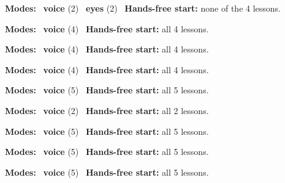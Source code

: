 \expandafter\def\csname hlchaptermodality384\endcsname{%
  {\small\noindent
    \textbf{Modes:} \hlvoicesign{}~\textbf{voice} (2) \quad \hlsightsign{}~\textbf{eyes} (2)\quad
    \hlvoicesign{}~\textbf{Hands-free start:} none of the 4 lessons.%
    \par}\medskip
}

\expandafter\def\csname hlchaptermodality385\endcsname{%
  {\small\noindent
    \textbf{Modes:} \hlvoicesign{}~\textbf{voice} (4)\quad
    \hlvoicesign{}~\textbf{Hands-free start:} all 4 lessons.%
    \par}\medskip
}

\expandafter\def\csname hlchaptermodality386\endcsname{%
  {\small\noindent
    \textbf{Modes:} \hlvoicesign{}~\textbf{voice} (4)\quad
    \hlvoicesign{}~\textbf{Hands-free start:} all 4 lessons.%
    \par}\medskip
}

\expandafter\def\csname hlchaptermodality387\endcsname{%
  {\small\noindent
    \textbf{Modes:} \hlvoicesign{}~\textbf{voice} (4)\quad
    \hlvoicesign{}~\textbf{Hands-free start:} all 4 lessons.%
    \par}\medskip
}

\expandafter\def\csname hlchaptermodality388\endcsname{%
  {\small\noindent
    \textbf{Modes:} \hlvoicesign{}~\textbf{voice} (5)\quad
    \hlvoicesign{}~\textbf{Hands-free start:} all 5 lessons.%
    \par}\medskip
}

\expandafter\def\csname hlchaptermodality389\endcsname{%
  {\small\noindent
    \textbf{Modes:} \hlvoicesign{}~\textbf{voice} (2)\quad
    \hlvoicesign{}~\textbf{Hands-free start:} all 2 lessons.%
    \par}\medskip
}

\expandafter\def\csname hlchaptermodality390\endcsname{%
  {\small\noindent
    \textbf{Modes:} \hlvoicesign{}~\textbf{voice} (5)\quad
    \hlvoicesign{}~\textbf{Hands-free start:} all 5 lessons.%
    \par}\medskip
}

\expandafter\def\csname hlchaptermodality391\endcsname{%
  {\small\noindent
    \textbf{Modes:} \hlvoicesign{}~\textbf{voice} (5)\quad
    \hlvoicesign{}~\textbf{Hands-free start:} all 5 lessons.%
    \par}\medskip
}

\expandafter\def\csname hlchaptermodality392\endcsname{%
  {\small\noindent
    \textbf{Modes:} \hlvoicesign{}~\textbf{voice} (5)\quad
    \hlvoicesign{}~\textbf{Hands-free start:} all 5 lessons.%
    \par}\medskip
}

